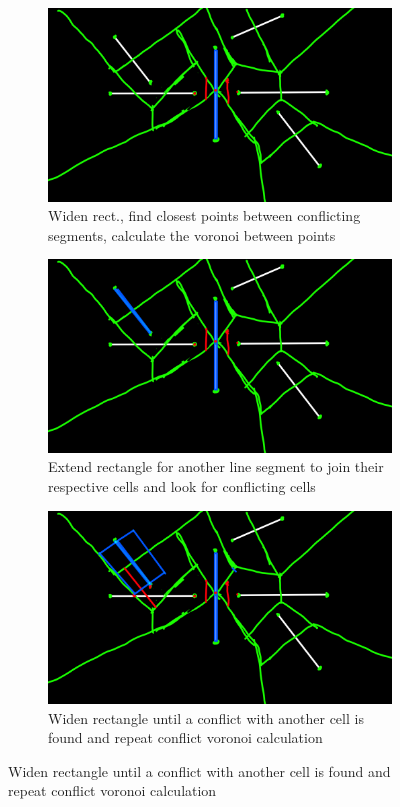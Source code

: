 \documentclass{article}
\begin{document}
\begin{figure}[h!]
	\centering

	\begin{subfigure}{0.3\linewidth}
		\includegraphics[width=\linewidth]{Step4.png}
		\caption{Widen rect., find closest points between conflicting segments, calculate the voronoi between points}
		\label{fig:Step4}
	\end{subfigure}%
	\hfill
	\begin{subfigure}{0.3\linewidth}
		\includegraphics[width=\linewidth]{Step5.png}
		\caption{Extend rectangle for another line segment to join their respective cells and look for conflicting cells}
		\label{fig:Step5}
	\end{subfigure}%
	\hfill
	\begin{subfigure}{0.3\linewidth}
		\includegraphics[width=\linewidth]{Step6.png}
		\caption{Widen rectangle until a conflict with another cell is found and repeat conflict voronoi calculation}
		\label{fig:Step6}
	\end{subfigure}
\end{figure}
\end{document}
